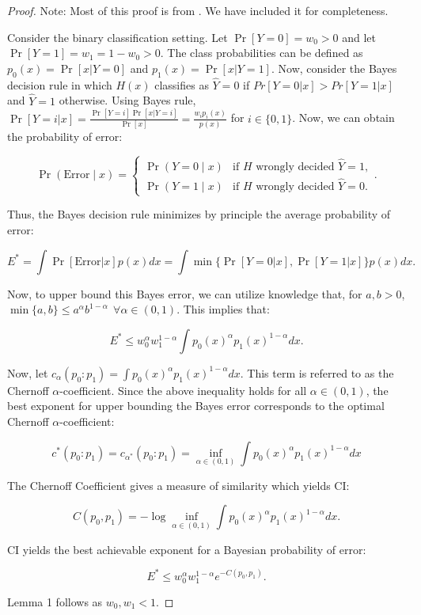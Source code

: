 \documentclass[11pt,letterpaper]{article}
\begin{document}
\begin{proof}
    Note: Most of this proof is from \citet{nielsen2011}. We have included it for completeness.


    Consider the binary classification setting. Let $\Pr[Y = 0] = w_0 > 0$ and let $\Pr[Y = 1] = w_1 = 1- w_0 > 0$. The class probabilities can be defined as $p_0(x) = \Pr[x|Y = 0]$ and  $p_1(x) = \Pr[x|Y = 1]$. Now, consider the Bayes decision rule in which $H(x)$ classifies as $\hat{Y} = 0$ if $Pr[Y = 0|x] > Pr[Y = 1|x]$ and $\hat{Y} = 1$ otherwise. Using Bayes rule,  $\Pr[Y = i|x] = \frac{\Pr[Y = i]\Pr[x|Y = i]}{\Pr[x]} = \frac{w_ip_i(x)}{p(x)}$ for $i \in \{0,1\}$. Now, we can obtain the probability of error:

$$
\Pr(\text{Error} \mid x) =
\begin{cases}
\Pr(Y = 0 \mid x) & \text{if } H \text{ wrongly decided } \hat{Y} = 1, \\
\Pr(Y = 1 \mid x) & \text{if } H \text{ wrongly decided } \hat{Y} = 0.
\end{cases}.
$$

Thus, the Bayes decision rule minimizes by principle the average probability of error:

$$
E^* = \int \Pr[\text{Error}|x]p(x)dx = \int \min\{\Pr[Y = 0|x], \Pr[Y = 1|x]\}p(x)dx.
$$

Now, to upper bound this Bayes error, we can utilize knowledge that, for $a,b > 0$, $\min\{a,b\} \leq a^\alpha b^{1-\alpha} ~~\forall\alpha \in (0,1)$. This implies that:

$$
E^* \leq w_0^\alpha w_1^{1-\alpha}\int p_0(x)^\alpha p_1(x)^{1-\alpha}dx. 
$$

Now, let $c_\alpha(p_0 : p_1) = \int p_0(x)^\alpha p_1(x)^{1-\alpha}dx$. This term is referred to as the Chernoff $\alpha$-coefficient. Since the above inequality holds for all $\alpha \in (0,1)$, the best exponent for upper bounding the Bayes error corresponds to the optimal Chernoff $\alpha$-coefficient:

$$
c^*(p_0:p_1) = c_{\alpha^*}(p_0:p_1) = \inf_{\alpha \in (0,1)}\int p_0(x)^\alpha p_1(x)^{1-\alpha}dx
$$

The Chernoff Coefficient gives a measure of similarity which yields CI:

$$
C(p_0,p_1) = -\log \inf_{\alpha \in (0,1)}\int p_0(x)^\alpha p_1(x)^{1-\alpha}dx.
$$

 CI yields the best achievable exponent for a Bayesian probability of error:

$$
E^* \leq w_0^\alpha w_1^{1-\alpha}e^{-C(p_0, p_1)}.
$$

Lemma 1 follows as $w_0, w_1 < 1$.
\end{proof}
\end{document}

